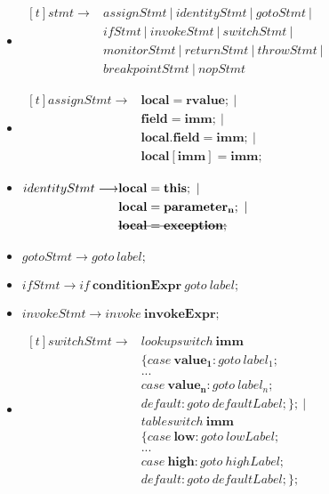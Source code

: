 \documentclass[12pt]{article}
\begin{document}
\begin{itemize}
\item
$\begin{aligned}[t]
stmt \longrightarrow &assignStmt~|~identityStmt~|~gotoStmt~|\\
&ifStmt~|~invokeStmt~|~switchStmt~|\\
&monitorStmt~|~returnStmt~|~throwStmt~|\\
&breakpointStmt~|~nopStmt
\end{aligned}$


\item
$\begin{aligned}[t]
assignStmt \longrightarrow &\mathbf{local} = \mathbf{rvalue};~|\\
&\mathbf{field} = \mathbf{imm};~|\\
&\mathbf{local.field} = \mathbf{imm}; ~|\\
&\mathbf{local[imm]} = \mathbf{imm}; 
\end{aligned}$

\item
$\begin{aligned}[t]
identityStmt \longrightarrow &\mathbf{local} = \mathbf{this}; ~|\\
&\mathbf{local} = \mathbf{parameter_n};~|\\
&\msout{\mathbf{local} = \mathbf{exception};}\\
\end{aligned}$

\item
$gotoStmt \longrightarrow goto~label;$

\item
$ifStmt \longrightarrow if~\mathbf{conditionExpr}~goto~label;$

\item
$invokeStmt \longrightarrow invoke~\mathbf{invokeExpr};$

\item
$\begin{aligned}[t]
switchStmt \longrightarrow &lookupswitch~\mathbf{imm}\\
&\{case~\mathbf{value_1}: goto~label_1;\\
&...\\
&case~\mathbf{value_n}: goto~label_n;\\
&default: goto~defaultLabel;\};~|\\
&tableswitch~\mathbf{imm}\\
&\{case~\mathbf{low}: goto~lowLabel;\\
&...\\
&case~\mathbf{high}: goto~highLabel;\\
&default: goto~defaultLabel;\};
\end{aligned}$


\end{itemize}
\end{document}

